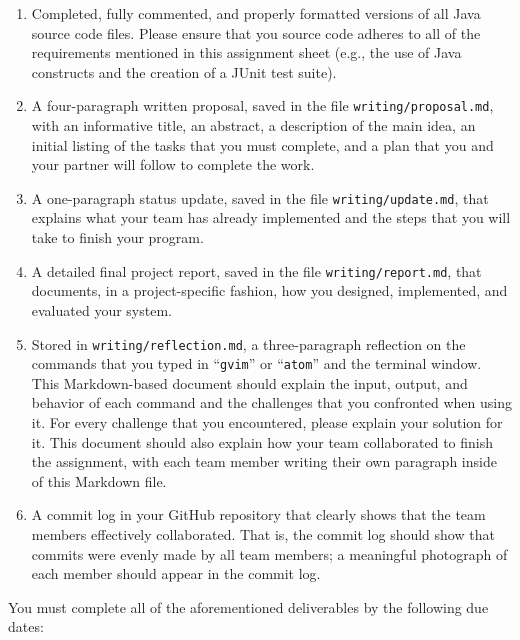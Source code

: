 \documentclass[11pt]{article}
\newcommand{\reflection}{\lstinline{writing/reflection.md}}
\newcommand{\command}[1]{``\lstinline{#1}''}
\newcommand{\program}[1]{\lstinline{#1}}
\begin{document}
\begin{enumerate}

  \setlength{\itemsep}{0in}

\item Completed, fully commented, and properly formatted versions of all Java
  source code files. Please ensure that you source code adheres to all of the
  requirements mentioned in this assignment sheet (e.g., the use of Java
  constructs and the creation of a JUnit test suite).

\item A four-paragraph written proposal, saved in the file
  \program{writing/proposal.md}, with an informative title, an abstract, a
  description of the main idea, an initial listing of the tasks that you must
  complete, and a plan that you and your partner will follow to complete the
  work.

\item A one-paragraph status update, saved in the file
  \program{writing/update.md}, that explains what your team has already
  implemented and the steps that you will take to finish your program.

\item A detailed final project report, saved in the file
  \program{writing/report.md}, that documents, in a project-specific fashion,
  how you designed, implemented, and evaluated your system.

\item Stored in \reflection{}, a three-paragraph reflection on the commands
  that you typed in \command{gvim} or \command{atom} and the terminal window.
  This Markdown-based document should explain the input, output, and behavior
  of each command and the challenges that you confronted when using it. For
  every challenge that you encountered, please explain your solution for it.
  This document should also explain how your team collaborated to finish the
  assignment, with each team member writing their own paragraph inside of this
  Markdown file.

\item A commit log in your GitHub repository that clearly shows that the team
  members effectively collaborated. That is, the commit log should show that
  commits were evenly made by all team members; a meaningful photograph of each
  member should appear in the commit log.

\end{enumerate}

\noindent
You must complete all of the aforementioned deliverables by the following due dates:
\end{document}
